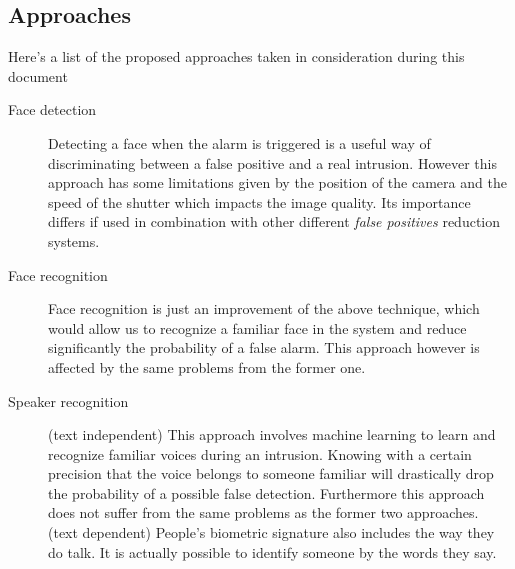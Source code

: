 \subsection{Approaches}
Here's a list of the proposed approaches taken in consideration during this document

\begin{description}
  \item[Face detection] Detecting a face when the alarm is triggered is a useful way of
  discriminating between a false positive and a real intrusion. However this approach has some limitations
  given by the position of the camera and the speed of the shutter which impacts the image quality.
  Its importance differs if used in combination with other different \textit{false positives} reduction
  systems.
  \item[Face recognition] Face recognition is just an improvement of the above technique, which would allow
  us to recognize a familiar face in the system and reduce significantly the probability of a false alarm.
  This approach however is affected by the same problems from the former one.
  \item[Speaker recognition](text independent) This approach involves machine learning to learn and recognize familiar voices
  during an intrusion. Knowing with a certain precision that the voice belongs to someone familiar will
  drastically drop the probability of a possible false detection. Furthermore this approach does not suffer
  from the same problems as the former two approaches.
  (text dependent) People's biometric signature also includes the way they do talk. It is
  actually possible to identify someone by the words they say.
\end{description}
